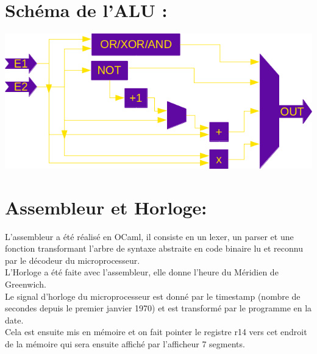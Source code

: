 \documentclass{article}
\begin{document}
		\section{Schéma de l'ALU :}
		\includegraphics[scale=0.75]{ual.png}
		\section{Assembleur et Horloge:}
		L'assembleur a été réalisé en OCaml, il consiste en un lexer, un parser et une fonction transformant l'arbre de syntaxe abstraite en code binaire lu et reconnu par le décodeur du microprocesseur.\\	
		L'Horloge a été faite avec l'assembleur, elle donne l'heure du Méridien de Greenwich.\\
		Le signal d'horloge du microprocesseur est donné par le timestamp (nombre de secondes depuis le premier janvier 1970) et est transformé par le programme en la date.\\
		Cela est ensuite mis en mémoire et on fait pointer le registre r14 vers cet endroit de la mémoire qui sera ensuite affiché par l'afficheur 7 segments.\\
\end{document}
